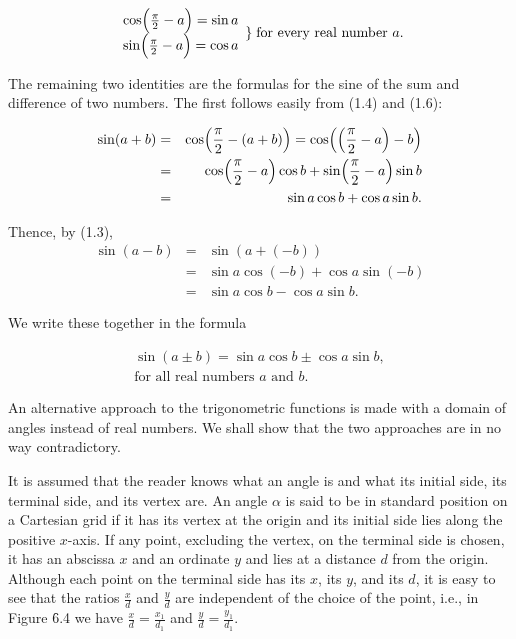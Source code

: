 \begin{theorem} %
$$
\begin{array}{l}
\cos \Bigl(\frac{\pi}{2} - a\Bigr) = \sin a  \\
\sin \Bigl(\frac{\pi}{2} - a\Bigr) = \cos a
\end{array}
 \} \;\mbox{for every real number $a$.}  
$$
\end{theorem}

The remaining two identities are the formulas for the sine of the sum and difference of two numbers. The first follows easily from (1.4) and (1.6):

\begin{eqnarray*}
\sin (a + b) &=& \cos \Bigl(\frac{\pi}{2} - (a + b) \Bigr) = \cos \Bigl(\Bigl(\frac{\pi}{2} -a\Bigr) - b\Bigr)\\
                  &=& \cos \Bigl(\frac{\pi}{2} -a\Bigr) \cos b + \sin \Bigl(\frac{\pi}{2} - a\Bigr) \sin b \\
                  &=& \sin a \cos b + \cos a \sin b.
\end{eqnarray*}

\noindent Thence, by (1.3), 
\begin{eqnarray*}
\sin(a-b) &=& \sin(a + (-b)) \\
              &=& \sin a \cos(-b) + \cos a \sin(-b) \\
              &=& \sin a \cos b - \cos a \sin b. 
\end{eqnarray*}

\noindent We write these together in the formula

\begin{theorem} %
$$
\begin{array}{c}
\sin(a \pm  b) = \sin a \cos b \pm \cos a \sin b, \\
\mbox{for all real numbers $a$ and $b$}.
\end{array}
$$
\end{theorem}

An alternative approach to the trigonometric functions is made with a domain of angles instead
of real numbers. We shall show that the two approaches are in no way contradictory.

It is assumed that the reader knows what an angle is and what its initial side, its terminal side, and its vertex are. An angle $\alpha$ is said to be in standard position on a Cartesian grid if it has its vertex at the origin and its initial side lies along the positive $x$-axis. If any point, excluding the vertex, on the terminal side is chosen, it has an abscissa $x$ and an ordinate $y$ and lies at a distance $d$ from the origin. Although each point on the terminal side has its $x$, its $y$, and its $d$, it is easy to see that the ratios $\frac{x}{d}$ and $\frac{y}{d}$ are independent of the choice of the point, i.e., in Figure \f{6.4} we have $\frac{x}{d} = \frac{x_1}{d_1}$ and $\frac{y}{d} = \frac{y_1}{d_1}$.  

